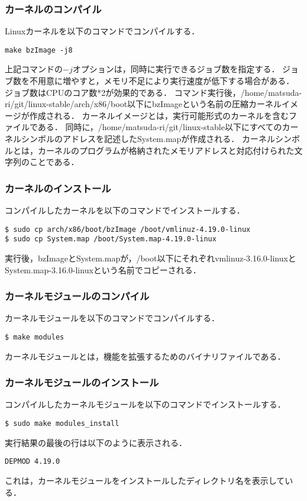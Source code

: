 \documentclass[12pt]{jsarticle}
\begin{document}
\subsubsection{カーネルのコンパイル}
Linuxカーネルを以下のコマンドでコンパイルする．
\begin{verbatim}
make bzImage -j8
\end{verbatim}
上記コマンドの$-j$オプションは，同時に実行できるジョブ数を指定する．
ジョブ数を不用意に増やすと，メモリ不足により実行速度が低下する場合がある．
ジョブ数はCPUのコア数*2が効果的である．
コマンド実行後，/home/matsuda-ri/git/linux-stable/arch/x86/boot以下にbzImageという名前の圧縮カーネルイメージが作成される．
カーネルイメージとは，実行可能形式のカーネルを含むファイルである．
同時に，/home/matsuda-ri/git/linux-stable以下にすべてのカーネルシンボルのアドレスを記述したSystem.mapが作成される．
カーネルシンボルとは，カーネルのプログラムが格納されたメモリアドレスと対応付けられた文字列のことである．

\subsubsection{カーネルのインストール}
コンパイルしたカーネルを以下のコマンドでインストールする．
\begin{verbatim}
$ sudo cp arch/x86/boot/bzImage /boot/vmlinuz-4.19.0-linux
$ sudo cp System.map /boot/System.map-4.19.0-linux
\end{verbatim}
実行後，bzImageとSystem.mapが，/boot以下にそれぞれvmlinuz-3.16.0-linuxとSystem.map-3.16.0-linuxという名前でコピーされる．

\subsubsection{カーネルモジュールのコンパイル}
カーネルモジュールを以下のコマンドでコンパイルする．
\begin{verbatim}
$ make modules
\end{verbatim}
カーネルモジュールとは，機能を拡張するためのバイナリファイルである．

\subsubsection{カーネルモジュールのインストール}
コンパイルしたカーネルモジュールを以下のコマンドでインストールする．
\begin{verbatim}
$ sudo make modules_install
\end{verbatim}
実行結果の最後の行は以下のように表示される．
\begin{verbatim}
DEPMOD 4.19.0
\end{verbatim}
これは，カーネルモジュールをインストールしたディレクトリ名を表示している．
\end{document}
